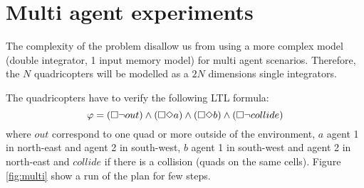 \section{Multi agent experiments}
The complexity of the problem disallow us from using a more complex model (double integrator, 1 input memory model) for multi agent scenarios.
Therefore, the $N$ quadricopters will be modelled as a $2N$ dimensions single integrators.

The quadricopters have to verify the following LTL formula:
$$ \varphi = (\square \neg out) \wedge (\square \Diamond a) \wedge (\square \Diamond b) \wedge (\square \neg collide)$$
where $out$ correspond to one quad or more outside of the environment, $a$ agent 1 in north-east and agent 2 in south-west, $b$ agent 1 in south-west and agent 2 in north-east and $collide$ if there is a collision (quads on the same cells).
Figure \ref{fig:multi} show a run of the plan for few steps.



